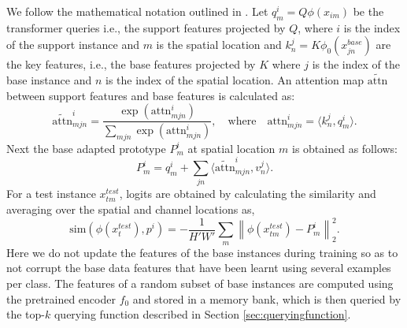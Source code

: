 \documentclass{bmvc2k}
\begin{document}
We follow the mathematical notation outlined in \cite{doersch2020crosstransformers}. Let \(q_{m}^{i}=Q\phi(x_\mathit{im})\) be the transformer queries i.e., the support features projected by $Q$, where $i$ is the index of the support instance and $m$ is the spatial location and \(k_{n}^{j}=K\phi_{0}(x_{jn}^\mathit{base})\) are the key features, i.e., the base features projected by $K$ where $j$ is the index of the base instance and $n$ is the index of the spatial location. An attention map \(\widetilde{\mathrm{attn}}\) between support features and base features is calculated as: 
\begin{equation}\widetilde{\mathrm{attn}}_{mjn}^{i} = \frac{\exp(\mathrm{attn}^{i}_{mjn})}{\sum_{mjn} \exp(\mathrm{attn}^{i}_{mjn})},\quad
\text{where}\quad \mathrm{attn}_{mjn}^{i} = \langle k^{j}_{n},q^{i}_{m} \rangle.\end{equation}
Next the base adapted prototype \(P_{m}^{i}\) at spatial location $m$ is obtained as follows:
\begin{equation}P_{m}^{i} = q_{m}^{i} + \sum_{jn} \langle\widetilde{\mathrm{attn}}_{mjn}^{i}, v_{n}^{j}\rangle.\end{equation}
For a test instance \(x_{tm}^\mathit{test}\), logits are obtained by calculating the similarity and averaging over the spatial and channel locations as,
\begin{equation}\mathrm{sim}(\phi(x_{t}^\mathit{test}), p^{i}) = - \frac{1}{H'W'}\sum _m \left \| \phi(x_{tm}^\mathit{test}) - P_{m}^{i} \right \|_{2}^{2}.\end{equation}
Here we do not update the features of the base instances during training so as to not corrupt the base data features that have been learnt using several examples per class. The features of a random subset of base instances are computed using the pretrained encoder \(f_{0}\) and stored in a memory bank, which is then queried by the top-$k$ querying function described in Section \ref{sec:queryingfunction}.
\end{document}
